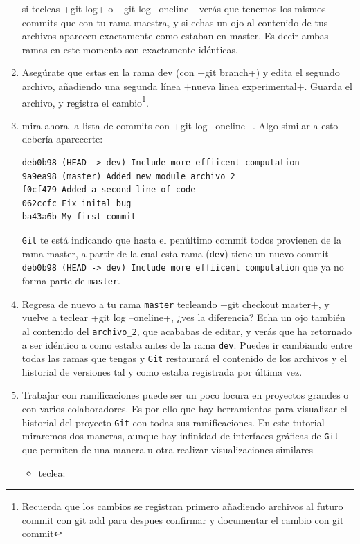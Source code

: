 \documentclass[a5paper, oneside,10pt]{article}
\begin{document}
\begin{enumerate}
    si tecleas \cverb+git log+ o \cverb+git log --oneline+ verás que tenemos los mismos commits que con tu rama maestra, y si echas un ojo al contenido de tus archivos aparecen exactamente como estaban en master. Es decir ambas ramas en este momento son exactamente idénticas.
    
    \item Asegúrate que estas en la rama dev (con \cverb+git branch+) y edita el segundo archivo, añadiendo una segunda línea \cverb+nueva linea experimental+. Guarda el archivo, y registra el cambio\footnote{Recuerda que los cambios se registran primero añadiendo archivos al futuro commit con git add para despues confirmar y documentar el cambio con git commit}.
    
    \item mira ahora la lista de commits con \cverb+git log --oneline+. Algo similar a esto debería aparecerte:
    
    \begin{lstlisting}[style=custom]
deb0b98 (HEAD -> dev) Include more effiicent computation
9a9ea98 (master) Added new module archivo_2
f0cf479 Added a second line of code
062ccfc Fix inital bug
ba43a6b My first commit
    \end{lstlisting}

    \verb+Git+ te está indicando que hasta el penúltimo commit todos provienen de la rama master, a partir de la cual esta rama (\verb+dev+) tiene un nuevo commit \verb+deb0b98 (HEAD -> dev) Include more effiicent computation+ que ya no forma parte de \verb+master+.
    
    \item Regresa de nuevo a tu rama \verb+master+ tecleando \cverb+git checkout master+, y vuelve a teclear \cverb+git log --oneline+, ¿ves la diferencia? Echa un ojo también al contenido del \verb+archivo_2+, que acababas de editar, y verás que ha retornado a ser idéntico a como estaba antes de la rama \verb+dev+. Puedes ir cambiando entre todas las ramas que tengas y \verb+Git+ restaurará el contenido de los archivos y el historial de versiones tal y como estaba registrada por última vez.
    
    \item Trabajar con ramificaciones puede ser un poco locura en proyectos grandes o con varios colaboradores. Es por ello que hay herramientas para visualizar el historial del proyecto \verb+Git+ con todas sus ramificaciones. En este tutorial miraremos dos maneras, aunque hay infinidad de interfaces gráficas de \verb+Git+ que permiten de una manera u otra realizar visualizaciones similares
    \begin{itemize}
     \item teclea: 
     

\end{itemize}
\end{enumerate}
\end{document}
